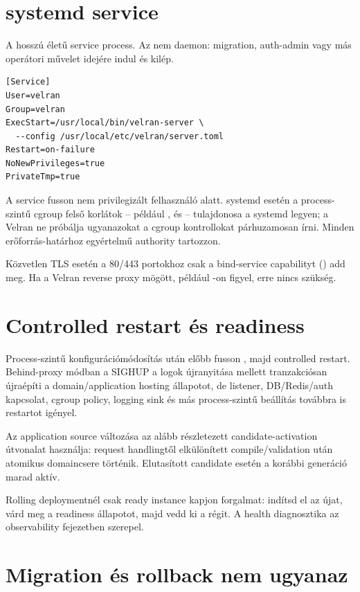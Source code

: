 \section{systemd service}

A  hosszú életű service process. Az  nem daemon: migration, auth-admin vagy más operátori művelet idejére indul és kilép.

\begin{lstlisting}
[Service]
User=velran
Group=velran
ExecStart=/usr/local/bin/velran-server \
  --config /usr/local/etc/velran/server.toml
Restart=on-failure
NoNewPrivileges=true
PrivateTmp=true
\end{lstlisting}

A service fusson nem privilegizált felhasználó alatt. systemd esetén a process-szintű cgroup felső korlátok -- például ,  és  -- tulajdonosa a systemd legyen; a Velran ne próbálja ugyanazokat a cgroup kontrollokat párhuzamosan írni. Minden erőforrás-határhoz egyértelmű authority tartozzon.

Közvetlen TLS esetén a 80/443 portokhoz csak a bind-service capabilityt () add meg. Ha a Velran reverse proxy mögött, például -on figyel, erre nincs szükség.

\section{Controlled restart és readiness}

Process-szintű konfigurációmódosítás után előbb fusson , majd controlled restart. Behind-proxy módban a SIGHUP a logok újranyitása mellett tranzakciósan újraépíti a domain/application hosting állapotot, de listener, DB/Redis/auth kapcsolat, cgroup policy, logging sink és más process-szintű beállítás továbbra is restartot igényel.

Az application source változása az alább részletezett candidate-activation útvonalat használja: request handlingtől elkülönített compile/validation után atomikus domaincsere történik. Elutasított candidate esetén a korábbi generáció marad aktív.

Rolling deploymentnél csak ready instance kapjon forgalmat: indítsd el az újat, várd meg a readiness állapotot, majd vedd ki a régit. A health diagnosztika az observability fejezetben szerepel.

\section{Migration és rollback nem ugyanaz}

